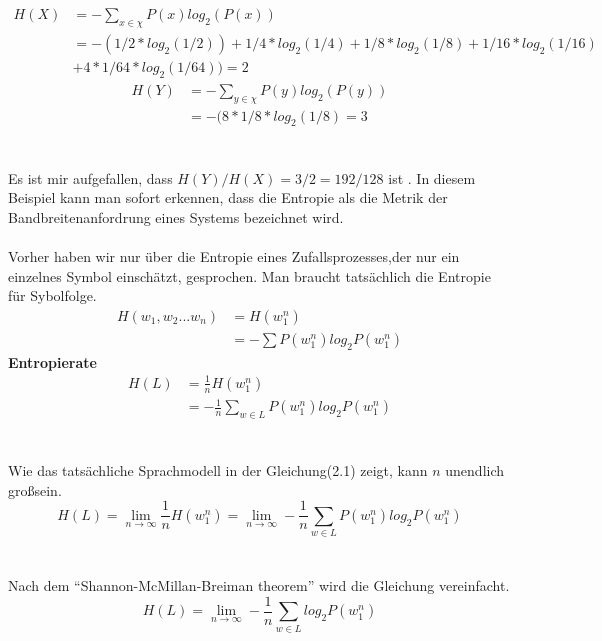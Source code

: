 \begin{align}
H(X) &=-\sum_{x\in\chi}P(x)log_{2}(P(x))\nonumber \\
		 &=-(1/2*log_{2}(1/2))+1/4*log_{2}(1/4)+1/8*log_{2}(1/8)+1/16*log_{2}(1/16)\nonumber \\
		 &+4*1/64*log_{2}(1/64))=2
\end{align}
\begin{align}
H(Y)&=-\sum_{y\in\chi}P(y)log_{2}(P(y))\\
	  &=-(8*1/8*log_{2}(1/8)=3
\end{align}
\\
\\
Es ist mir aufgefallen, dass $H(Y)/H(X)=3/2=192/128$ ist . In diesem Beispiel kann man sofort erkennen, dass die Entropie als die Metrik der Bandbreitenanfordrung eines Systems bezeichnet wird.
\\
\\   
Vorher haben wir nur \"uber die Entropie eines Zufallsprozesses,der nur ein einzelnes Symbol einsch\"atzt, gesprochen. Man braucht tats\"achlich die Entropie f\"ur Sybolfolge.
\begin{align}
H(w_{1},w_{2}...w_{n})&=H(w_{1}^{n})\nonumber \\
											&=-\sum{P(w_{1}^{n})log_{2}P(w_{1}^{n})}
\end{align}
\textbf{Entropierate}
\begin{align}
H(L)&=\frac{1}{n}H(w_{1}^{n})\nonumber \\
		&=-\frac{1}{n}\sum_{w\in L}P(w_{1}^{n})log_{2}P(w_{1}^{n})
\end{align}
\\
\\
Wie das tats\"achliche Sprachmodell in der Gleichung(2.1) zeigt, kann $n$ unendlich gro\ss  sein.
\begin{equation}
H(L)=\lim_{n\to\infty}\frac{1}{n}H(w_{1}^{n})=\lim_{n\to\infty}-\frac{1}{n}\sum_{w\in L}P(w_{1}^{n})log_{2}P(w_{1}^{n})
\end{equation}
\\
\\
Nach dem "`Shannon-McMillan-Breiman theorem"' wird die Gleichung vereinfacht.
\begin{equation}
H(L)=\lim_{n\to\infty}-\frac{1}{n}\sum_{w\in L}log_{2}P(w_{1}^{n})
\end{equation}
\\
\\
